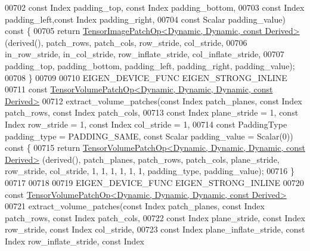 \begin{DoxyCode}
00702                           \textcolor{keyword}{const} Index padding\_top, \textcolor{keyword}{const} Index padding\_bottom,
00703                           \textcolor{keyword}{const} Index padding\_left,\textcolor{keyword}{const} Index padding\_right,
00704                           \textcolor{keyword}{const} Scalar padding\_value)\textcolor{keyword}{ const }\{
00705       \textcolor{keywordflow}{return} \hyperlink{class_eigen_1_1_tensor_image_patch_op}{TensorImagePatchOp<Dynamic, Dynamic, const Derived>}
      (derived(), patch\_rows, patch\_cols, row\_stride, col\_stride,
00706                                                                  in\_row\_stride, in\_col\_stride, 
      row\_inflate\_stride, col\_inflate\_stride,
00707                                                                  padding\_top, padding\_bottom, padding\_left,
       padding\_right, padding\_value);
00708     \}
00709 
00710     EIGEN\_DEVICE\_FUNC EIGEN\_STRONG\_INLINE
00711     \textcolor{keyword}{const} \hyperlink{class_eigen_1_1_tensor_volume_patch_op}{TensorVolumePatchOp<Dynamic, Dynamic, Dynamic, const Derived>}
00712     extract\_volume\_patches(\textcolor{keyword}{const} Index patch\_planes, \textcolor{keyword}{const} Index patch\_rows, \textcolor{keyword}{const} Index patch\_cols,
00713                            \textcolor{keyword}{const} Index plane\_stride = 1, \textcolor{keyword}{const} Index row\_stride = 1, \textcolor{keyword}{const} Index col\_stride
       = 1,
00714                            \textcolor{keyword}{const} PaddingType padding\_type = PADDING\_SAME, \textcolor{keyword}{const} Scalar padding\_value = 
      Scalar(0))\textcolor{keyword}{ const }\{
00715       \textcolor{keywordflow}{return} \hyperlink{class_eigen_1_1_tensor_volume_patch_op}{TensorVolumePatchOp<Dynamic, Dynamic, Dynamic, const Derived>}
      (derived(), patch\_planes, patch\_rows, patch\_cols, plane\_stride, row\_stride, col\_stride, 1, 1, 1, 1, 1, 1, 
      padding\_type, padding\_value);
00716     \}
00717 
00718 
00719     EIGEN\_DEVICE\_FUNC EIGEN\_STRONG\_INLINE
00720     \textcolor{keyword}{const} \hyperlink{class_eigen_1_1_tensor_volume_patch_op}{TensorVolumePatchOp<Dynamic, Dynamic, Dynamic, const Derived>}
00721     extract\_volume\_patches(\textcolor{keyword}{const} Index patch\_planes, \textcolor{keyword}{const} Index patch\_rows, \textcolor{keyword}{const} Index patch\_cols,
00722                            \textcolor{keyword}{const} Index plane\_stride, \textcolor{keyword}{const} Index row\_stride, \textcolor{keyword}{const} Index col\_stride,
00723                            \textcolor{keyword}{const} Index plane\_inflate\_stride, \textcolor{keyword}{const} Index row\_inflate\_stride, \textcolor{keyword}{const} Index 

\end{DoxyCode}
